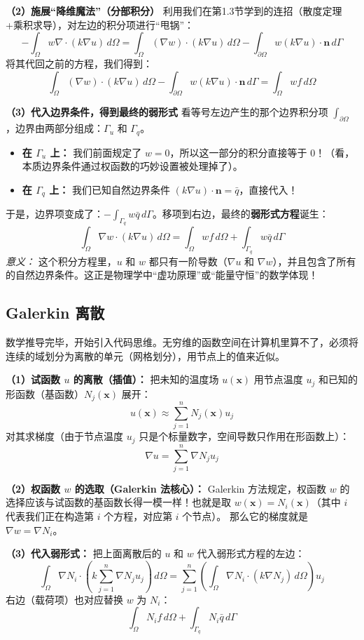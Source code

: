 \documentclass[11pt, a4paper, UTF8]{ctexart}
\begin{document}
\textbf{（2）施展“降维魔法”（分部积分）}
利用我们在第1.3节学到的连招（散度定理+乘积求导），对左边的积分项进行“甩锅”：
\[ -\int_{\Omega} w \nabla \cdot (k \nabla u) \, d\Omega = \int_{\Omega} (\nabla w) \cdot (k \nabla u) \, d\Omega - \int_{\partial\Omega} w (k \nabla u) \cdot \bm{n} \, d\Gamma \]
将其代回之前的方程，我们得到：
\[ \int_{\Omega} (\nabla w) \cdot (k \nabla u) \, d\Omega - \int_{\partial\Omega} w (k \nabla u) \cdot \bm{n} \, d\Gamma = \int_{\Omega} w f \, d\Omega \]

\textbf{（3）代入边界条件，得到最终的弱形式}
看等号左边产生的那个边界积分项 $\int_{\partial\Omega}$，边界由两部分组成：$\Gamma_u$ 和 $\Gamma_q$。
\begin{itemize}
    \item \textbf{在 $\Gamma_u$ 上：} 我们前面规定了 $w=0$，所以这一部分的积分直接等于 $0$！（看，本质边界条件通过权函数的巧妙设置被处理掉了）。
    \item \textbf{在 $\Gamma_q$ 上：} 我们已知自然边界条件 $(k \nabla u) \cdot \bm{n} = \bar{q}$，直接代入！
\end{itemize}
于是，边界项变成了：$-\int_{\Gamma_q} w \bar{q} \, d\Gamma$。移项到右边，最终的\textbf{弱形式方程}诞生：
\[ \int_{\Omega} \nabla w \cdot (k \nabla u) \, d\Omega = \int_{\Omega} w f \, d\Omega + \int_{\Gamma_q} w \bar{q} \, d\Gamma \]
\textit{意义：} 这个积分方程里，$u$ 和 $w$ 都只有一阶导数（$\nabla u$ 和 $\nabla w$），并且包含了所有的自然边界条件。这正是物理学中“虚功原理”或“能量守恒”的数学体现！

\subsection{Galerkin 离散}
数学推导完毕，开始引入代码思维。无穷维的函数空间在计算机里算不了，必须将连续的域划分为离散的单元（网格划分），用节点上的值来近似。

\textbf{（1）试函数 $u$ 的离散（插值）：}
把未知的温度场 $u(\bm{x})$ 用节点温度 $u_j$ 和已知的形函数（基函数）$N_j(\bm{x})$ 展开：
\[ u(\bm{x}) \approx \sum_{j=1}^{n} N_j(\bm{x}) u_j \]
对其求梯度（由于节点温度 $u_j$ 只是个标量数字，空间导数只作用在形函数上）：
\[ \nabla u = \sum_{j=1}^{n} \nabla N_j u_j \]

\textbf{（2）权函数 $w$ 的选取（Galerkin 法核心）：}
Galerkin 方法规定，权函数 $w$ 的选择应该与试函数的基函数长得一模一样！也就是取 $w(\bm{x}) = N_i(\bm{x})$（其中 $i$ 代表我们正在构造第 $i$ 个方程，对应第 $i$ 个节点）。
那么它的梯度就是 $\nabla w = \nabla N_i$。

\textbf{（3）代入弱形式：}
把上面离散后的 $u$ 和 $w$ 代入弱形式方程的左边：
\[ \int_{\Omega} \nabla N_i \cdot \left( k \sum_{j=1}^{n} \nabla N_j u_j \right) \, d\Omega = \sum_{j=1}^{n} \left( \int_{\Omega} \nabla N_i \cdot (k \nabla N_j) \, d\Omega \right) u_j \]
右边（载荷项）也对应替换 $w$ 为 $N_i$：
\[ \int_{\Omega} N_i f \, d\Omega + \int_{\Gamma_q} N_i \bar{q} \, d\Gamma \]
\end{document}
